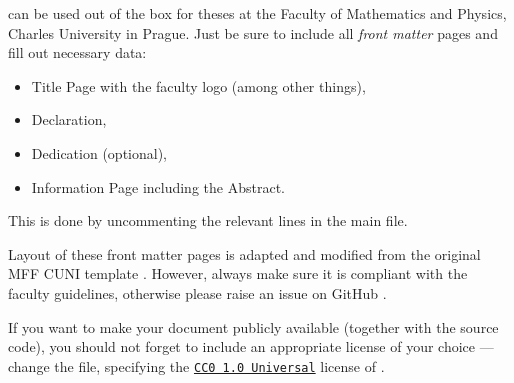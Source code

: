\begin{remark}
    \TeXsis{} can be used out of the box for theses at the Faculty of Mathematics and Physics, Charles University in Prague.
    Just be sure to include all \emph{front matter} pages and fill out necessary data:
    \begin{itemize}
        \item \textsf{Title Page} with the faculty logo (among other things),
        \item \textsf{Declaration},
        \item \textsf{Dedication} (optional),
        \item \textsf{Information Page} including the \textsf{Abstract}.
    \end{itemize}
    This is done by uncommenting the relevant lines in the main  file.

    Layout of these front matter pages is adapted and modified from the original MFF CUNI template \autocite{MaresTemplate}.
    However, always make sure it is compliant with the faculty guidelines, otherwise please raise an issue on \textsf{GitHub} \autocite{TeXsis}.
\end{remark}

\begin{remark}[License]
    If you want to make your document publicly available (together with the source code), you should not forget to include an appropriate license of your choice --- change the  file, specifying the \href{https://creativecommons.org/publicdomain/zero/1.0/}{\texttt{CC0 1.0 Universal}} license of \TeXsis{}.
\end{remark}

